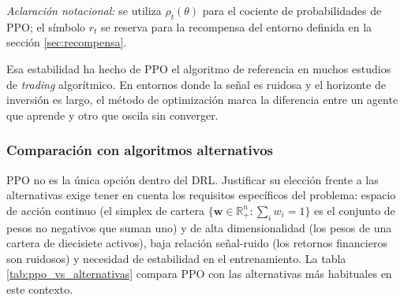 \documentclass[IB,a4paper]{TFUOC}
\begin{document}
\noindent\textit{Aclaración notacional:} se utiliza $\rho_t(\theta)$ para el cociente de probabilidades de PPO; el símbolo $r_t$ se reserva para la recompensa del entorno definida en la sección \ref{sec:recompensa}.

Esa estabilidad ha hecho de PPO el algoritmo de referencia en muchos estudios de \textit{trading} algorítmico. En entornos donde la señal es ruidosa y el horizonte de inversión es largo, el método de optimización marca la diferencia entre un agente que aprende y otro que oscila sin converger.

\subsubsection{Comparación con algoritmos alternativos}
\label{sec:ppo_vs_alternativas}

PPO no es la única opción dentro del DRL. Justificar su elección frente a las alternativas exige tener en cuenta los requisitos específicos del problema: espacio de acción continuo (el simplex de cartera $\{\mathbf{w} \in \mathbb{R}^n_+ : \sum_i w_i = 1\}$ es el conjunto de pesos no negativos que suman uno) y de alta dimensionalidad (los pesos de una cartera de diecisiete activos), baja relación señal-ruido (los retornos financieros son ruidosos) y necesidad de estabilidad en el entrenamiento. La tabla \ref{tab:ppo_vs_alternativas} compara PPO con las alternativas más habituales en este contexto.
\end{document}
